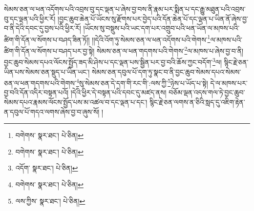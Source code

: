 སེམས་ཅན་ལ་ཕན་འདོགས་པའི་འབྲས་བུ་དང་ལྡན་པ་ཞེས་བྱ་བས་ནི་རྣམ་པར་སྨིན་པ་དང་རྒྱུ་མཐུན་པའི་འབྲས་བུ་དང་ལྡན་པའི་ཕྱིར་རོ། །བྱང་ཆུབ་ཆེན་པོ་ཡོངས་སུ་རྫོགས་པར་བྱེད་པའི་དོན་ཆེན་པོ་དང་ལྡན་པ་ཡིན་ནོ་ཞེས་བྱ་བ་ནི་དེའི་དབང་དུ་བྱས་པའི་ཕྱིར་རོ། །ཡོངས་སུ་བསྡུས་པའི་ཡང་དག་པར་འགྲུབ་པའི་ཕན་ཡོན་ལ་མཁས་པའི་ཚིག་གི་དོན་ལ་སོགས་པ་བཤད་ཟིན་ཏོ།། །།དེའི་འོག་ཏུ་སེམས་ཅན་ལ་ཕན་འདོགས་པའི་གེགས་\footnote{བགེགས་  སྣར་ཐང་།  པེ་ཅིན། }ལ་མཁས་པའི་ཚིག་གི་དོན་ལ་སོགས་པ་བཤད་པར་བྱ་སྟེ། སེམས་ཅན་ལ་ཕན་གདགས་པའི་གེགས་\footnote{བགེགས་  སྣར་ཐང་།  པེ་ཅིན། }ལ་མཁས་པ་ཞེས་བྱ་བ་ནི། བྱང་ཆུབ་སེམས་དཔའ་ལོངས་སྤྱོད་ཟད་མི་ཤེས་པ་དང་ལྡན་པས་སྦྱིན་པར་བྱ་བའི་ཆོས་ཀྱང་བདོག་\footnote{འདོག་  སྣར་ཐང་།  པེ་ཅིན། }ལ། སྙིང་རྗེ་ཅན་ཡིན་པས་སེམས་ཅན་སྡུད་པ་ཡིན་ཡང་། སེམས་ཅན་དབུལ་པོ་དག་ཏུ་སྣང་བ་ནི་བྱང་ཆུབ་སེམས་དཔའ་སེམས་ཅན་ལ་ཕན་གདགས་པའི་གེགས་\footnote{བགེགས་  སྣར་ཐང་།  པེ་ཅིན། }སུ་སེམས་ཅན་དེ་དག་གི་རང་གི་:ལས་ཀྱི་\footnote{ལས་ཀྱིས་  སྣར་ཐང་།  པེ་ཅིན། }ཉེས་པ་ཡོད་པ་སྟེ། དེ་ལ་མཁས་པར་བྱ་བའི་དོན་འདིར་བསྟན་པའོ། །དེའི་ཕྱིར་དེ་བསྟན་པའི་དབང་དུ་མཛད་ནས། བཅོམ་ལྡན་འདས་གལ་ཏེ་བྱང་ཆུབ་སེམས་དཔའ་རྣམས་ལོངས་སྤྱོད་པས་མ་འཚལ་བ་དང་ལྡན་པ་དང་། སྙིང་རྗེ་ཅན་ལགས་ན་ཅིའི་སླད་དུ་འཇིག་རྟེན་ན་དབུལ་པོ་གདའ་ལགས་ཞེས་བྱ་བ་ཞུས་སོ། །

